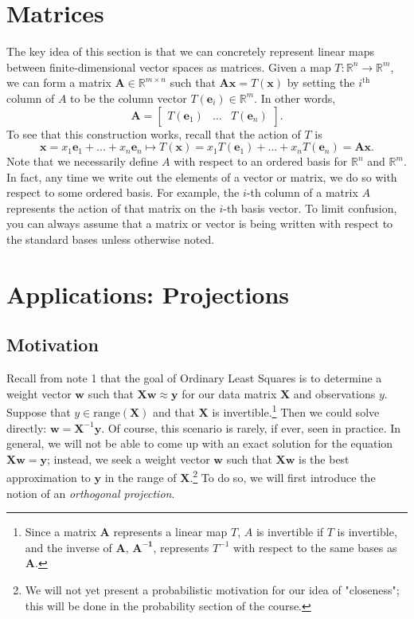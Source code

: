 \documentclass{article}
\newcommand{\R}{\mathbb{R}}
\newcommand{\tit}{\textit}
\newcommand{\tbf}{\textbf}
\begin{document}
\section{Matrices}
The key idea of this section is that we can concretely represent linear maps between finite-dimensional vector spaces as matrices. Given a map $T: \R^n \to \R^m$, we can form a matrix $\tbf{A} \in \R^{m\times n}$ such that $\tbf{A}\tbf{x} = T(\tbf{x})$ by setting the $i^{\text{th}}$ column of $A$ to be the column vector $T(\tbf{e}_i) \in \R^m$. In other words, 
$$
\tbf{A} = 
\begin{bmatrix}
T(\tbf{e}_1) & \dots & T(\tbf{e}_n) 
\end{bmatrix}.
$$
To see that this construction works, recall that the action of $T$ is
 $$
 \tbf{x} = x_1\tbf{e}_1 + ... + x_n \tbf{e}_n \mapsto T(\tbf{x}) = x_1T(\tbf{e}_1) + ... + x_n T(\tbf{e}_n) = \tbf{A}\tbf{x}.
 $$
Note that we necessarily define $A$ with respect to an ordered basis for $\R^n$ and $\R^m$. In fact, any time we write out the elements of a vector or matrix, we do so with respect to some ordered basis. For example, the $i$-th column of a matrix $A$ represents the action of that matrix on the $i$-th basis vector. To limit confusion, you can always assume that a matrix or vector is being written with respect to the standard bases unless otherwise noted.

\clearpage
\section*{Applications: Projections}
\subsection*{Motivation}
Recall from note 1 that the goal of Ordinary Least Squares is to determine a weight vector $\mathbf{w}$ such that $\mathbf{Xw} \approx \mathbf{y}$ for our data matrix $\mathbf{X}$ and observations $y$. Suppose that $y \in \text{range}(\mathbf{X})$ and that $\mathbf{X}$ is invertible.\footnote{Since a matrix $\mathbf{A}$ represents a linear map $T$, $A$ is invertible if $T$ is invertible, and the inverse of $\mathbf{A}$, $\mathbf{A^{-1}}$, represents $T^{-1}$ with respect to the same bases as $\mathbf{A}$.} Then we could solve directly: $\mathbf{w} = \mathbf{X}^{-1}\mathbf{y}$. Of course, this scenario is rarely, if ever, seen in practice. In general, we will not be able to come up with an exact solution for the equation $\mathbf{Xw} = \mathbf{y}$; instead, we seek a weight vector $\mathbf{w}$ such that $\mathbf{Xw}$ is the best approximation to $\mathbf{y}$ in the range of $\mathbf{X}$.\footnote{We will not yet present a probabilistic motivation for our idea of "closeness"; this will be done in the probability section of the course.} To do so, we will first introduce the notion of an \tit{orthogonal projection}.
\end{document}
